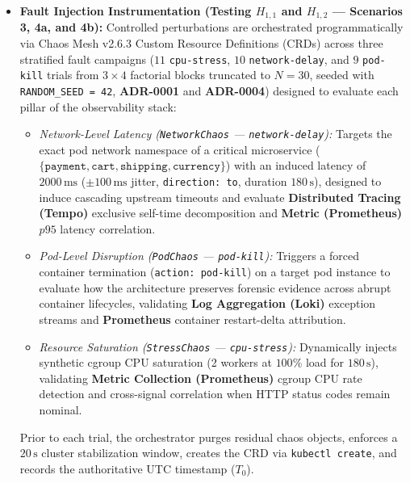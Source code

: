 \begin{itemize}
    \item \textbf{Fault Injection Instrumentation (Testing $H_{1,1}$ and $H_{1,2}$ --- Scenarios 3, 4a, and 4b):} Controlled perturbations are orchestrated programmatically via Chaos Mesh v2.6.3 Custom Resource Definitions (CRDs) across three stratified fault campaigns ($11$ \texttt{cpu-stress}, $10$ \texttt{network-delay}, and $9$ \texttt{pod-kill} trials from $3 \times 4$ factorial blocks truncated to $N=30$, seeded with \texttt{RANDOM\_SEED = 42}, \textbf{ADR-0001} and \textbf{ADR-0004}) designed to evaluate each pillar of the observability stack:
    \begin{itemize}
        \item \textit{Network-Level Latency (\texttt{NetworkChaos} --- \texttt{network-delay}):} Targets the exact pod network namespace of a critical microservice ($\{\texttt{payment}, \texttt{cart}, \texttt{shipping}, \texttt{currency}\}$) with an induced latency of $2000\,\text{ms}$ ($\pm 100\,\text{ms}$ jitter, \texttt{direction: to}, duration $180\,\text{s}$), designed to induce cascading upstream timeouts and evaluate \textbf{Distributed Tracing (Tempo)} exclusive self-time decomposition and \textbf{Metric (Prometheus)} $p95$ latency correlation.
        \item \textit{Pod-Level Disruption (\texttt{PodChaos} --- \texttt{pod-kill}):} Triggers a forced container termination (\texttt{action: pod-kill}) on a target pod instance to evaluate how the architecture preserves forensic evidence across abrupt container lifecycles, validating \textbf{Log Aggregation (Loki)} exception streams and \textbf{Prometheus} container restart-delta attribution.
        \item \textit{Resource Saturation (\texttt{StressChaos} --- \texttt{cpu-stress}):} Dynamically injects synthetic cgroup CPU saturation (2 workers at $100\%$ load for $180\,\text{s}$), validating \textbf{Metric Collection (Prometheus)} cgroup CPU rate detection and cross-signal correlation when HTTP status codes remain nominal.
    \end{itemize}
    Prior to each trial, the orchestrator purges residual chaos objects, enforces a $20\,\text{s}$ cluster stabilization window, creates the CRD via \texttt{kubectl create}, and records the authoritative UTC timestamp ($T_0$).


\end{itemize}
